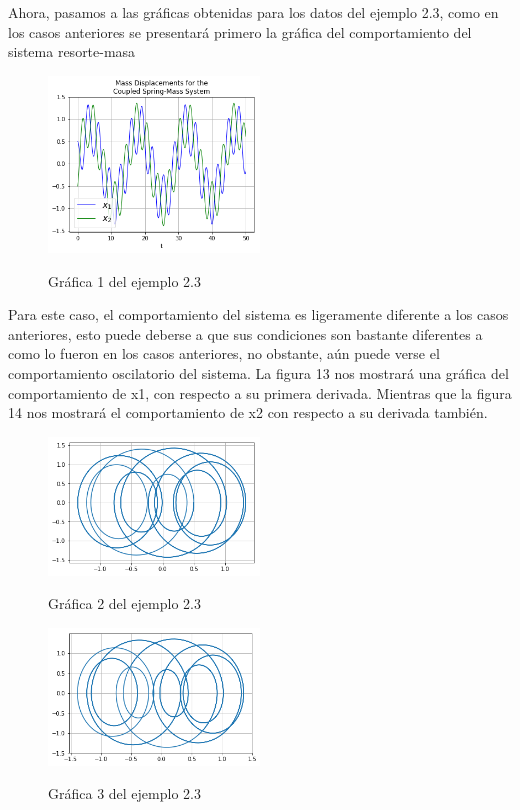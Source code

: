 \documentclass{article}
\begin{document}
Ahora, pasamos a las gráficas obtenidas para los datos del ejemplo 2.3, como en los casos anteriores se presentará primero la gráfica del comportamiento del sistema resorte-masa
\begin{figure}[H]
    \caption{Gráfica 1 del ejemplo 2.3}
    \includegraphics[width=0.5\textwidth]{Grafica6.png}
    \centering
    \label{Cod}
\end{figure}
Para este caso, el comportamiento del sistema es ligeramente diferente a los casos anteriores, esto puede deberse a que sus condiciones son bastante diferentes a como lo fueron en los casos anteriores, no obstante, aún puede verse el comportamiento oscilatorio del sistema.
La figura 13 nos mostrará una gráfica del comportamiento de x1, con respecto a su primera derivada. Mientras que la figura 14 nos mostrará el comportamiento de x2 con respecto a su derivada también.
\begin{figure}[H]
    \caption{Gráfica 2 del ejemplo 2.3}
    \includegraphics[width=0.5\textwidth]{Grafica7.png}
    \centering
    \label{Cod}
\end{figure}
\begin{figure}[H]
    \caption{Gráfica 3 del ejemplo 2.3}
    \includegraphics[width=0.5\textwidth]{Grafica8.png}
    \centering
    \label{Cod}
\end{figure}
\end{document}
